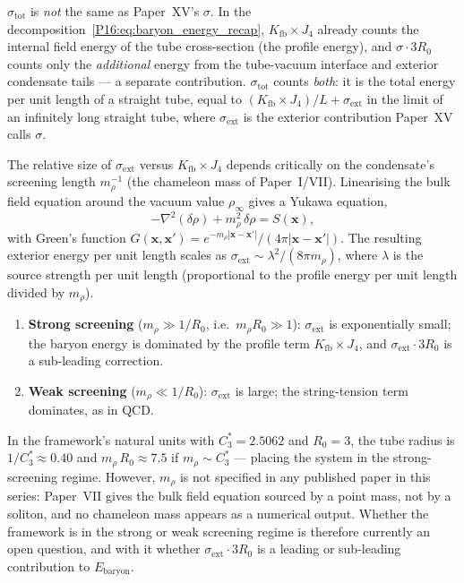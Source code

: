 \documentclass[11pt,a4paper]{article}
\theoremstyle{definition}\newtheorem{definition}[theorem]{Definition}
\theoremstyle{remark}
\theoremstyle{definition}\newtheorem{construction}[theorem]{Construction}
\newcommand{\Kfb}{K_{\mathrm{fb}}}
\begin{document}
$\sigma_{\mathrm{tot}}$ is \emph{not} the same as Paper~XV's $\sigma$.
In the decomposition~\eqref{P16:eq:baryon_energy_recap}, $\Kfb\times J_4$
already counts the internal field energy of the tube cross-section
(the profile energy), and $\sigma\cdot3R_0$ counts only the
\emph{additional} energy from the tube-vacuum interface and exterior
condensate tails --- a separate contribution.  $\sigma_{\mathrm{tot}}$
counts \emph{both}: it is the total energy per unit length of a straight
tube, equal to $(\Kfb\times J_4)/L + \sigma_{\mathrm{ext}}$ in the
limit of an infinitely long straight tube, where $\sigma_{\mathrm{ext}}$
is the exterior contribution Paper~XV calls $\sigma$.

The relative size of $\sigma_{\mathrm{ext}}$ versus $\Kfb\times J_4$
depends critically on the condensate's screening length $m_\rho^{-1}$
(the chameleon mass of Paper~I/VII).  Linearising the bulk field
equation around the vacuum value $\rho_\infty$ gives a Yukawa equation,
\begin{equation}
  -\nabla^2(\delta\rho) + m_\rho^2\,\delta\rho = S(\mathbf{x}),
\end{equation}
with Green's function $G(\mathbf{x},\mathbf{x}')=e^{-m_\rho|\mathbf{x}-\mathbf{x}'|}/(4\pi|\mathbf{x}-\mathbf{x}'|)$.
The resulting exterior energy per unit length scales as
$\sigma_{\mathrm{ext}}\sim\lambda^2/(8\pi m_\rho)$, where $\lambda$ is
the source strength per unit length (proportional to the profile energy
per unit length divided by $m_\rho$).
\begin{enumerate}[label=(\roman*)]
\item \textbf{Strong screening} ($m_\rho\gg1/R_0$, i.e.\
  $m_\rho R_0\gg1$): $\sigma_{\mathrm{ext}}$ is exponentially small;
  the baryon energy is dominated by the profile term $\Kfb\times J_4$,
  and $\sigma_{\mathrm{ext}}\cdot3R_0$ is a sub-leading correction.
\item \textbf{Weak screening} ($m_\rho\ll1/R_0$): $\sigma_{\mathrm{ext}}$
  is large; the string-tension term dominates, as in QCD.
\end{enumerate}
In the framework's natural units with $C_3^*=2.5062$ and $R_0=3$, the
tube radius is $1/C_3^*\approx0.40$ and $m_\rho\,R_0\approx7.5$ if
$m_\rho\sim C_3^*$ --- placing the system in the strong-screening
regime.  However, $m_\rho$ is not specified in any published paper in
this series: Paper~VII gives the bulk field equation sourced by a
point mass, not by a soliton, and no chameleon mass appears as a
numerical output.  Whether the framework is in the strong or weak
screening regime is therefore currently an open question, and with it
whether $\sigma_{\mathrm{ext}}\cdot3R_0$ is a leading or sub-leading
contribution to $E_{\mathrm{baryon}}$.
\end{document}
